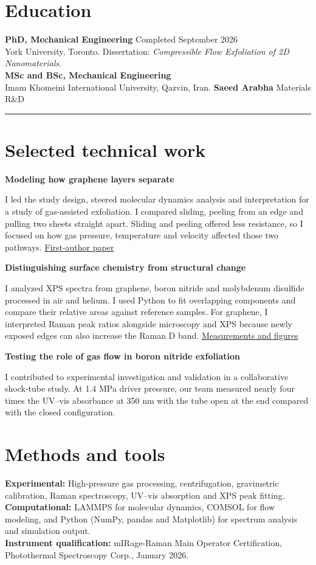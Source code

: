 \documentclass[11pt,letterpaper]{article}
\begin{document}
\section*{Education}
\textbf{PhD, Mechanical Engineering} \hfill Completed September 2026\\
York University, Toronto. Dissertation: \textit{Compressible Flow Exfoliation of 2D Nanomaterials}.\\[4pt]
\textbf{MSc and BSc, Mechanical Engineering}\\
Imam Khomeini International University, Qazvin, Iran.
\newpage
{\large\bfseries\color{myblue} Saeed Arabha} \hfill Materials R\&D\\[-1pt]
{\color{myblue}\rule{\linewidth}{0.5pt}}
\section*{Selected technical work}
\textbf{Modeling how graphene layers separate}\par
I led the study design, steered molecular dynamics analysis and interpretation for a study of gas-assisted exfoliation. I compared sliding, peeling from an edge and pulling two sheets straight apart. Sliding and peeling offered less resistance, so I focused on how gas pressure, temperature and velocity affected those two pathways. \href{https://doi.org/10.1021/acsanm.6c01419}{First-author paper}
\medskip

\textbf{Distinguishing surface chemistry from structural change}\par
I analyzed XPS spectra from graphene, boron nitride and molybdenum disulfide processed in air and helium. I used Python to fit overlapping components and compare their relative areas against reference samples. For graphene, I interpreted Raman peak ratios alongside microscopy and XPS because newly exposed edges can also increase the Raman D band. \href{https://www.saeedarabha.com/metrology}{Measurements and figures}
\medskip

\textbf{Testing the role of gas flow in boron nitride exfoliation}\par
I contributed to experimental investigation and validation in a collaborative shock-tube study. At 1.4 MPa driver pressure, our team measured nearly four times the UV--vis absorbance at 350 nm with the tube open at the end compared with the closed configuration.
\section*{Methods and tools}
\textbf{Experimental:} High-pressure gas processing, centrifugation, gravimetric calibration, Raman spectroscopy, UV--vis absorption and XPS peak fitting.\\[4pt]
\textbf{Computational:} LAMMPS for molecular dynamics, COMSOL for flow modeling, and Python (NumPy, pandas and Matplotlib) for spectrum analysis and simulation output.\\[4pt]
\textbf{Instrument qualification:} mIRage-Raman Main Operator Certification, Photothermal Spectroscopy Corp., January 2026.
\end{document}
